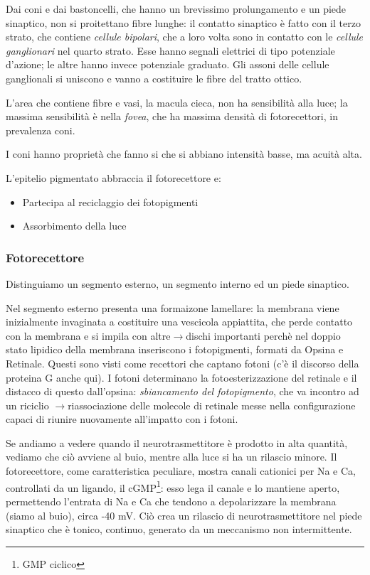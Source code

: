 \documentclass[a4paper,12pt]{article}
\newcommand{\lfreccia}{\ensuremath{\longrightarrow}}
\begin{document}
Dai coni e dai bastoncelli, che hanno un brevissimo prolungamento e un piede sinaptico, non si proitettano fibre lunghe: il contatto sinaptico è fatto con il terzo strato, che contiene \emph{cellule bipolari}, che a loro volta sono in contatto con le \emph{cellule ganglionari} nel quarto strato. Esse hanno segnali elettrici di tipo potenziale d'azione; le altre hanno invece potenziale graduato. Gli assoni delle cellule ganglionali si uniscono e vanno a costituire le fibre del tratto ottico.

L'area che contiene fibre e vasi, la macula cieca, non ha sensibilità alla luce; la massima sensibilità è nella \emph{fovea}, che ha massima densità di fotorecettori, in prevalenza coni.

I coni hanno proprietà che fanno si che si abbiano intensità basse, ma acuità alta.

L'epitelio pigmentato abbraccia il fotorecettore e:
\begin{itemize}
\item{Partecipa al reciclaggio dei fotopigmenti}
\item{Assorbimento della luce}
\end{itemize}

\subsubsection{Fotorecettore}
Distinguiamo un segmento esterno, un segmento interno ed un piede sinaptico.

Nel segmento esterno presenta una formaizone lamellare: la membrana viene inizialmente invaginata a costituire una vescicola appiattita, che perde contatto con la membrana e si impila con altre\lfreccia dischi  importanti perchè nel doppio stato lipidico della membrana inseriscono i fotopigmenti, formati da Opsina e Retinale. Questi sono visti come recettori che captano fotoni (c'è il discorso della proteina G anche qui). I fotoni determinano la fotoesterizzazione del retinale e il distacco di questo dall'opsina: \emph{sbiancamento del fotopigmento}, che va incontro ad un riciclio \lfreccia riassociazione delle molecole di retinale messe nella configurazione capaci di riunire nuovamente all'impatto con i fotoni.

Se andiamo a vedere quando il neurotrasmettitore è prodotto in alta quantità, vediamo che ciò avviene al buio, mentre alla luce si ha un rilascio minore. Il fotorecettore, come caratteristica peculiare, mostra canali cationici per Na e Ca, controllati da un ligando, il cGMP\footnote{GMP ciclico}: esso lega il canale e lo mantiene aperto, permettendo l'entrata di Na e Ca che tendono a depolarizzare la membrana (siamo al buio), circa -40 mV. Ciò crea un rilascio di neurotrasmettitore nel piede sinaptico che è tonico, continuo, generato da un meccanismo non intermittente. 
\end{document}
